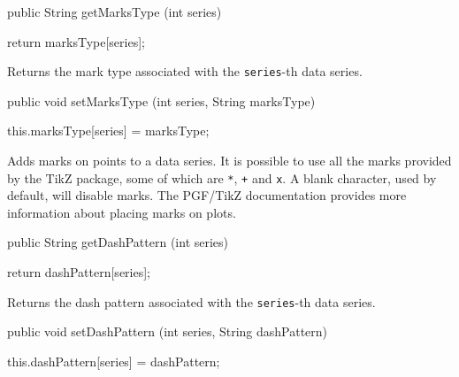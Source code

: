 \begin{code}

   public String getMarksType (int series) \begin{hide} {
      return marksType[series];
   }\end{hide}
\end{code}
\begin{tabb}
   Returns the mark type associated with the \texttt{series}-th data series.
\end{tabb}
\begin{htmlonly}
\end{htmlonly}
\begin{code}

   public void setMarksType (int series, String marksType) \begin{hide} {
      this.marksType[series] = marksType;
   }\end{hide}
\end{code}
\begin{tabb}
   Adds marks on points to a data series.
   It is possible to use all the marks provided by the TikZ package,
   some of which are \texttt{*}, \texttt{+} and \texttt{x}.
   A blank character, used by default, will disable marks. The PGF/TikZ
   documentation provides more information about placing marks on plots.
\end{tabb}
\begin{htmlonly}
\end{htmlonly}
\begin{code}

   public String getDashPattern (int series) \begin{hide} {
      return dashPattern[series];
   }\end{hide}
\end{code}
\begin{tabb}
   Returns the dash pattern associated with the \texttt{series}-th data series.
\end{tabb}
\begin{htmlonly}
\end{htmlonly}
\begin{code}

   public void setDashPattern (int series, String dashPattern) \begin{hide} {
      this.dashPattern[series] = dashPattern;
   }\end{hide}
\end{code}
